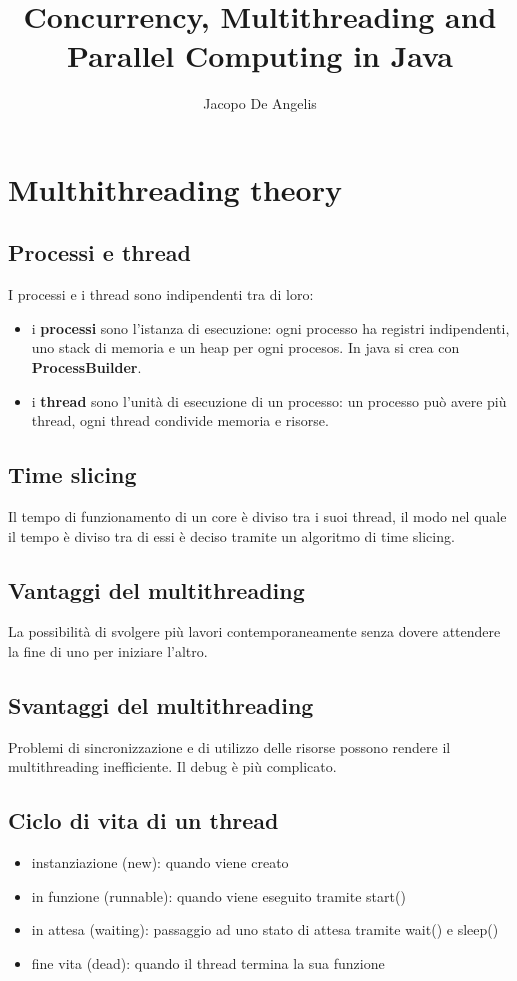 \documentclass[11pt,a4paper]{book}
\begin{document}
\title{Concurrency, Multithreading and Parallel Computing in Java}
\author{Jacopo De Angelis}
\maketitle

\pagebreak
\tableofcontents
\pagebreak

\chapter{Multhithreading theory}
\section{Processi e thread}
I processi e i thread sono indipendenti tra di loro:
\begin{itemize}
	\item i \textbf{processi} sono l'istanza di esecuzione: ogni processo ha registri indipendenti, uno stack di memoria e un heap per ogni procesos. In java si crea con \textbf{ProcessBuilder}.
	\item i \textbf{thread} sono l'unità di esecuzione di un processo: un processo può avere più thread, ogni thread condivide memoria e risorse.
\end{itemize}

\section{Time slicing}
Il tempo di funzionamento di un core è diviso tra i suoi thread, il modo nel quale il tempo è diviso tra di essi è deciso tramite un algoritmo di time slicing.

\section{Vantaggi del multithreading}
La possibilità di svolgere più lavori contemporaneamente senza dovere attendere la fine di uno per iniziare l'altro.

\section{Svantaggi del multithreading}
Problemi di sincronizzazione e di utilizzo delle risorse possono rendere il multithreading inefficiente. Il debug è più complicato.

\section{Ciclo di vita di un thread}
\begin{itemize}
	\item instanziazione (new): quando viene creato
	\item in funzione (runnable): quando viene eseguito tramite start()
	\item in attesa (waiting): passaggio ad uno stato di attesa tramite wait() e sleep()
	\item fine vita (dead): quando il thread termina la sua funzione
\end{itemize}
\end{document}
